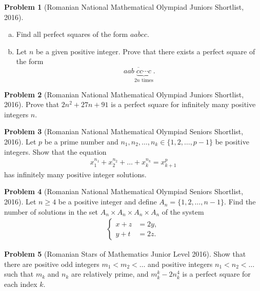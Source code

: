 \documentclass[]{article}
\theoremstyle{definition}
\newtheorem{problem}{Problem}
\begin{document}
\begin{problem}[Romanian National Mathematical Olympiad Juniors Shortlist, 2016]
	$ $
	\begin{enumerate}[(a)]
		\item Find all perfect squares of the form $\overline{aabcc}$.
		\item Let $n$ be a given positive integer. Prove that there exists a perfect square of the form $$\overline{aab\underbrace{cc\cdots c}_{2n\text{ times}}}.$$
	\end{enumerate}
\end{problem}



\begin{problem}[Romanian National Mathematical Olympiad Juniors Shortlist, 2016]
	Prove that $2n^2 + 27n + 91$ is a perfect square for infinitely many positive integers $n$.
\end{problem}


\begin{problem}[Romanian National Mathematical Olympiad Seniors Shortlist, 2016]
	Let $p$ be a prime number and $n_1, n_2, \dots, n_k \in \{1, 2, \dots, p -1\}$ be positive integers. Show that the equation
		\begin{align*}
			x_1^{n_1} + x_2^{n_2} + \dots + x_k^{n_k} = x_{k+1}^p
		\end{align*}
	has infinitely many positive integer solutions.
\end{problem}


\begin{problem}[Romanian National Mathematical Olympiad Seniors Shortlist, 2016]
	Let $n \geq 4$ be a positive integer and define $A_n = \{1, 2, \dots, n -1\}$. Find the number of solutions in the set $A_n \times  A_n \times A_n \times A_n$ of the system
		\begin{align*}
			\begin{cases}
				x+z &= 2y,\\
				y+t &= 2z.
			\end{cases}
		\end{align*}
\end{problem}



\begin{problem}[Romanian Stars of Mathematics Junior Level 2016]
	Show that there are positive odd integers $m_1 < m_2 < \dots  $ and positive integers $n_1 < n_2 < \dots$ such that $m_k$ and $n_k$ are relatively prime, and $m_k^k − 2n_k^4$ is a perfect square for each index $k$.
\end{problem}
\end{document}
